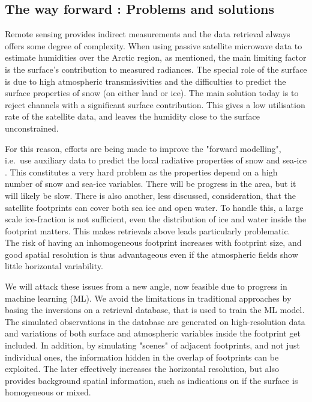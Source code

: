 \documentclass[12pt,oneside,a4paper]{article}
\begin{document}
\subsection{The way forward : Problems and solutions }


Remote sensing provides indirect measurements and the data retrieval always
offers some degree of complexity. When using passive satellite microwave data
to estimate humidities over the Arctic region, as mentioned, the main
limiting factor is the surface's contribution to measured radiances. The
special role of the surface is due to high atmospheric transmissivities and the
difficulties to predict the surface properties of snow (on either land or ice).
The main solution today is to reject channels with a significant surface
contribution. This gives a low utilisation rate of the satellite data, and
leaves the humidity close to the surface unconstrained.

For this reason, efforts are being made to improve the "forward modelling",
i.e.\ use auxiliary data to predict the local radiative properties of snow and
sea-ice \citep[e.g.][]{tonboe:2010:thesi}. This constitutes a very hard problem
as the properties depend on a high number of snow and sea-ice
variables. There will be progress in the area, but it will likely be slow.
There is also another, less discussed, consideration, that the satellite
footprints can cover both sea ice and open water. To handle this, a large scale
ice-fraction is not sufficient, even the distribution of ice and water inside
the footprint matters. This makes retrievals above leads particularly
problematic. The risk of having an inhomogeneous footprint increases with
footprint size, and good spatial resolution is thus advantageous even if the
atmospheric fields show little horizontal variability.



We will attack these issues from a new angle, now feasible due to progress in
machine learning (ML). We avoid the limitations in traditional approaches by
basing the inversions on a retrieval database, that is used to train the ML
model. The simulated observations in the database are generated on
high-resolution data and variations of both surface and atmospheric variables
inside the footprint get included. In addition, by simulating "scenes" of
adjacent footprints, and not just individual ones, the information hidden in
the overlap of footprints can be exploited. The later effectively increases the
horizontal resolution, but also provides background spatial information, such
as indications on if the surface is homogeneous or mixed.
\end{document}
